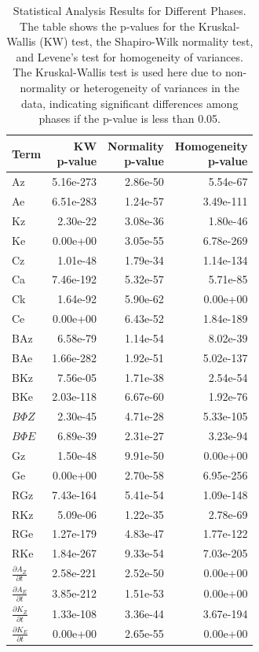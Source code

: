 \begin{table}[!htbp]
\centering
\caption[Statistical Analysis Results for Different Phases]{Statistical Analysis Results for Different Phases. The table shows the p-values for the Kruskal-Wallis (KW) test, the Shapiro-Wilk normality test, and Levene's test for homogeneity of variances. The Kruskal-Wallis test is used here due to non-normality or heterogeneity of variances in the data, indicating significant differences among phases if the p-value is less than 0.05.}
\label{tab:lec_stats_phases}
\begin{tabular}{lrrr}
\toprule
\textbf{Term} & \makecell{\textbf{KW} \\ \textbf{p-value}} & \makecell{\textbf{Normality} \\ \textbf{p-value}} & \makecell{\textbf{Homogeneity} \\ \textbf{p-value}} \\
\midrule
Az & 5.16e-273 & 2.86e-50 & 5.54e-67 \\
Ae & 6.51e-283 & 1.24e-57 & 3.49e-111 \\
Kz & 2.30e-22 & 3.08e-36 & 1.80e-46 \\
Ke & 0.00e+00 & 3.05e-55 & 6.78e-269 \\
Cz & 1.01e-48 & 1.79e-34 & 1.14e-134 \\
Ca & 7.46e-192 & 5.32e-57 & 5.71e-85 \\
Ck & 1.64e-92 & 5.90e-62 & 0.00e+00 \\
Ce & 0.00e+00 & 6.43e-52 & 1.84e-189 \\
BAz & 6.58e-79 & 1.14e-54 & 8.02e-39 \\
BAe & 1.66e-282 & 1.92e-51 & 5.02e-137 \\
BKz & 7.56e-05 & 1.71e-38 & 2.54e-54 \\
BKe & 2.03e-118 & 6.67e-60 & 1.92e-76 \\
$B\Phi Z$ & 2.30e-45 & 4.71e-28 & 5.33e-105 \\
$B\Phi E$ & 6.89e-39 & 2.31e-27 & 3.23e-94 \\
Gz & 1.50e-48 & 9.91e-50 & 0.00e+00 \\
Ge & 0.00e+00 & 2.70e-58 & 6.95e-256 \\
RGz & 7.43e-164 & 5.41e-54 & 1.09e-148 \\
RKz & 5.09e-06 & 1.22e-35 & 2.78e-69 \\
RGe & 1.27e-179 & 4.83e-47 & 1.77e-122 \\
RKe & 1.84e-267 & 9.33e-54 & 7.03e-205 \\
$\frac{\partial A_Z}{\partial t}$ & 2.58e-221 & 2.52e-50 & 0.00e+00 \\
$\frac{\partial A_E}{\partial t}$ & 3.85e-212 & 1.51e-53 & 0.00e+00 \\
$\frac{\partial K_Z}{\partial t}$ & 1.33e-108 & 3.36e-44 & 3.67e-194 \\
$\frac{\partial K_E}{\partial t}$ & 0.00e+00 & 2.65e-55 & 0.00e+00 \\
\bottomrule
\end{tabular}
\end{table}

